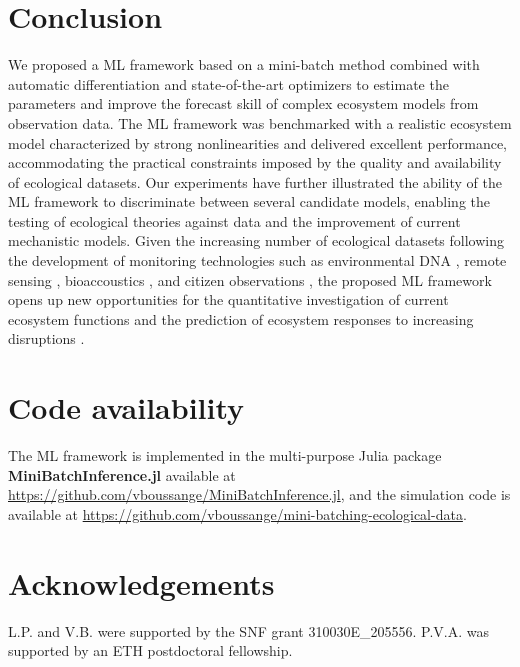 \section{Conclusion}
We proposed a ML framework based on a mini-batch method combined with automatic differentiation and state-of-the-art optimizers to estimate the parameters and improve the forecast skill of complex ecosystem models from observation data.
% 
The ML framework was benchmarked with a realistic ecosystem model characterized by strong nonlinearities and delivered excellent performance, accommodating the practical constraints imposed by the quality and availability of ecological datasets.  Our experiments have further illustrated the ability of the ML framework to discriminate between several candidate models, enabling the testing of ecological theories against data and the improvement of current mechanistic models.
% 
Given the increasing number of ecological datasets following the development of monitoring technologies such as environmental DNA \citep{Ruppert2019}, remote sensing \citep{Jetz2019}, bioaccoustics \citep{Aide2013}, and citizen observations \citep{GBIF}, the proposed ML framework opens up new opportunities for the quantitative investigation of current ecosystem functions \citep{Curtsdotter2019} and the prediction of ecosystem responses to increasing disruptions \citep{Urban2016}.

\section{Code availability}
The ML framework is implemented in the multi-purpose Julia package \textbf{MiniBatchInference.jl} available at \href{https://github.com/vboussange/MiniBatchInference.jl}{https://github.com/vboussange/MiniBatchInference.jl}, and the simulation code is available at \href{https://github.com/vboussange/mini-batching-ecological-data}{https://github.com/vboussange/mini-batching-ecological-data}.


\section{Acknowledgements}
L.P. and V.B. were supported by the SNF grant 310030E\_205556. 
P.V.A. was supported by an ETH postdoctoral fellowship. 

